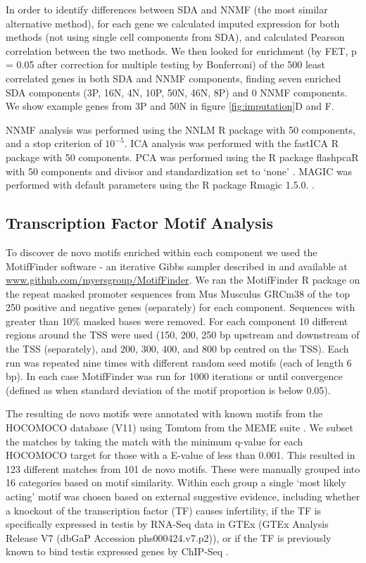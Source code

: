 In order to identify differences between SDA and NNMF (the most similar alternative method), for each gene we calculated imputed expression for both methods (not using single cell components from SDA), and calculated Pearson correlation between the two methods. We then looked for enrichment (by FET, p = 0.05 after correction for multiple testing by Bonferroni) of the 500 least correlated genes in both SDA and NNMF components, finding seven enriched SDA components (3P, 16N, 4N, 10P, 50N, 46N, 8P) and 0 NNMF components. We show example genes from 3P and 50N in figure \ref{fig:imputation}D and F.

NNMF analysis was performed using the NNLM R package \parencite{Lin2019NNLM} with 50 components, and a stop criterion of $10^{-5}$. ICA analysis was performed with the fastICA R package \parencite{Marchini2017fastICA} with 50 components. PCA was performed using the R package flashpcaR with 50 components and divisor and standardization set to ‘none’ \parencite{Abraham2014Fast}. MAGIC was performed with default parameters using the R package Rmagic 1.5.0. \parencite{vanDijk2018Recovering}.


\subsection{Transcription Factor Motif Analysis}
\label{sec:motifs_methods}
To discover de novo motifs enriched within each component we used the MotifFinder software - an iterative Gibbs sampler described in \cite{Altemose2017map, Davies2016Reengineering} and available at \url{www.github.com/myersgroup/MotifFinder}. We ran the MotifFinder R package on the repeat masked promoter sequences from Mus Musculus GRCm38 of the top 250 positive and negative genes (separately) for each component. Sequences with greater than 10\% masked bases were removed. For each component 10 different regions around the TSS were used (150, 200, 250 bp upstream and downstream of the TSS (separately), and 200, 300, 400, and 800 bp centred on the TSS). Each run was repeated nine times with different random seed motifs (each of length 6 bp). In each case MotifFinder was run for 1000 iterations or until convergence (defined as when standard deviation of the motif proportion is below 0.05).

The resulting de novo motifs were annotated with known motifs from the HOCOMOCO database (V11) using Tomtom from the MEME suite \parencite{Bailey2015MEME, Gupta2007Quantifying, Kulakovskiy2018HOCOMOCO}. We subset the matches by taking the match with the minimum q-value for each HOCOMOCO target for those with a E-value of less than 0.001. This resulted in 123 different matches from 101 de novo motifs. These were manually grouped into 16 categories based on motif similarity. Within each group a single ‘most likely acting’ motif was chosen based on external suggestive evidence, including whether a knockout of the transcription factor (TF) causes infertility, if the TF is specifically expressed in testis by RNA-Seq data in GTEx (GTEx Analysis Release V7 (dbGaP Accession phs000424.v7.p2)), or if the TF is previously known to bind testis expressed genes by ChIP-Seq \parencite{GTExConsortium2013GenotypeTissue}.

